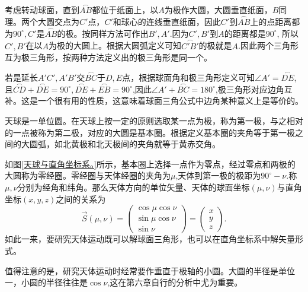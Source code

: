 \documentclass[11pt, a4paper, oneside]{ctexart}
\numberwithin{equation}{subsection}
\begin{document}
考虑转动球面，直到$\overset{\frown}{AB}$都位于纸面上，以$A$为极作大圆，大圆垂直纸面，$B$同理。两个大圆交点为$C'$点，$C'$和球心的连线垂直纸面，因此$C'$到$\overset{\frown}{AB}$上的点距离都为$90^{\circ},C'$是$\overset{\frown}{AB}$的极。按同样方法可作出$B',A'$.因为$C',B'$到$A$的距离都是$90^{\circ}$, 所以$C',B'$在以$A$为极的大圆上。根据大圆弧定义可知$\overset{\frown}{C'B'}$的极就是$A$.因此两个三角形互为极三角形，按两种方法定义出的极三角形是同一个。

若是延长$A'C',A'B'$交$\overset{\frown}{BC}$于$D,E$点，根据球面角和极三角形定义可知$\angle A'=\overset{\frown}{DE}$,且$\overset{\frown}{CD}+\overset{\frown}{DE}=90^{\circ},\overset{\frown}{DE}+\overset{\frown}{EB}=90^{\circ}$,因此$\angle A'+\overset{\frown}{BC}=180^{\circ}$,极三角形对应边角互补。这是一个很有用的性质，这意味着球面三角公式中边角某种意义上是等价的。

天球是一单位圆。在天球上按一定的原则选取某一点为极，称为第一极，与之相对的一点被称为第二极，对应的大圆是基本圈。根据定义基本圈的夹角等于第一极之间的大圆弧，如北黄极和北天极间的夹角就等于黄赤交角。

如图\ref{天球与直角坐标系。}所示，基本圈上选择一点作为零点，经过零点和两极的大圆称为零经圈。零经圈与天体经圈的夹角为$\mu$,天体到第一极的极距为$90^\circ-\nu$.称$\mu,\nu$分别为经角和纬角。那么天体方向的单位矢量、天体的球面坐标$\left(\mu,\nu\right)$与直角坐标$\left(x,y,z\right)$之间的关系为
\begin{equation}
\vec{S}\left(\mu,\nu\right)=
\begin{pmatrix}
\cos\mu\cos\nu\\
\sin\mu\cos\nu\\
\sin\nu
\end{pmatrix}=
\begin{pmatrix}
x\\y\\z
\end{pmatrix}.
\end{equation}
如此一来，要研究天体运动既可以解球面三角形，也可以在直角坐标系中解矢量形式。

值得注意的是，研究天体运动时经常要作垂直于极轴的小圆。大圆的半径是单位一，小圆的半径往往是$\cos\nu$,这在第六章自行的分析中尤为重要。
\end{document}
